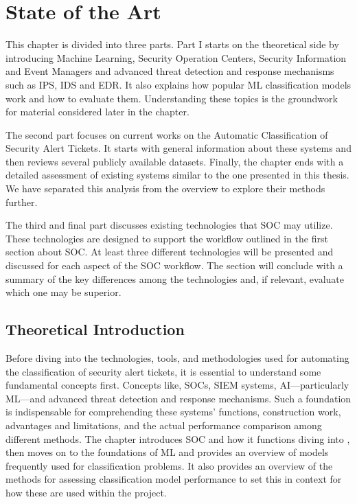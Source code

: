 \chapter{State of the Art}
\label{chap:Chapter2}

This chapter is divided into three parts. 
Part I starts on the theoretical side by introducing Machine Learning, Security Operation Centers, Security Information and Event Managers and advanced threat detection and response mechanisms such as \gls{IPS}, \gls{IDS} and \gls{EDR}. 
It also explains how popular \gls{ML} classification models work and how to evaluate them. 
Understanding these topics is the groundwork for material considered later in the chapter.

The second part focuses on current works on the Automatic Classification of Security Alert Tickets. 
It starts with general information about these systems and then reviews several publicly available datasets. 
Finally, the chapter ends with a detailed assessment of existing systems similar to the one presented in this thesis.
We have separated this analysis from the overview to explore their methods further.

The third and final part discusses existing technologies that \gls{SOC} may utilize. 
These technologies are designed to support the workflow outlined in the first section about \gls{SOC}. 
At least three different technologies will be presented and discussed for each aspect of the \gls{SOC} workflow. 
The section will conclude with a summary of the key differences among the technologies and, if relevant, evaluate which one may be superior.

\section{Theoretical Introduction}

Before diving into the technologies, tools, and methodologies used for automating the classification of security alert tickets, it is essential to understand some fundamental concepts first. 
Concepts like, \gls{SOC}s, \gls{SIEM} systems, \gls{AI}—particularly \gls{ML}—and advanced threat detection and response mechanisms. 
Such a foundation is indispensable for comprehending these systems' functions, construction work, advantages and limitations, and the actual performance comparison among different methods. 
The chapter introduces \gls{SOC} and how it functions diving into , then moves on to the foundations of \gls{ML} and provides an overview of models frequently used for classification problems. 
It also provides an overview of the methods for assessing classification model performance to set this in context for how these are used within the project.

